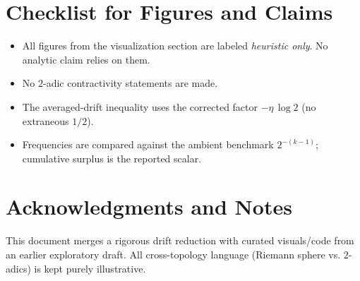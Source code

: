 \documentclass[11pt]{article}
\theoremstyle{plain}
\theoremstyle{definition}
\theoremstyle{remark}
\newcommand{\1}{\mathbf{1}}
\begin{document}
\section*{Checklist for Figures and Claims}
\begin{itemize}
  \item All figures from the visualization section are labeled \emph{heuristic only}. No analytic claim relies on them.
  \item No $2$-adic contractivity statements are made.
  \item The averaged-drift inequality uses the corrected factor $-\eta\,\log 2$ (no extraneous $1/2$).
  \item Frequencies are compared against the ambient benchmark $2^{-(k-1)}$; cumulative surplus is the reported scalar.
\end{itemize}

\section*{Acknowledgments and Notes}
This document merges a rigorous drift reduction with curated visuals/code from an earlier exploratory draft. All cross-topology language (Riemann sphere vs. $2$-adics) is kept purely illustrative.


\nocite{*}


\end{document}
